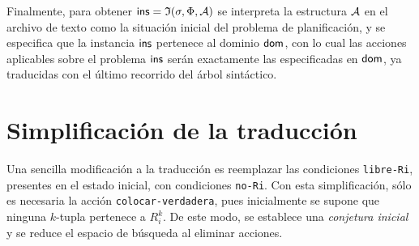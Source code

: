 Finalmente, para obtener $\mathsf{ins}=\mathfrak{I}(\sigma,\Phi,\mathcal{A})$ se interpreta la
estructura $\mathcal{A}$ en el archivo de texto como la situación inicial del problema
de planificación, y se especifica que la instancia $\mathsf{ins}$ pertenece al
dominio $\mathsf{dom}$, con lo cual las acciones aplicables sobre el problema
$\mathsf{ins}$ serán exactamente las especificadas en $\mathsf{dom}$, ya traducidas con
el último recorrido del árbol sintáctico.

\section{Simplificación de la traducción}
Una sencilla modificación a la traducción es reemplazar las
condiciones \texttt{libre-Ri}, presentes en el estado inicial, con
condiciones \texttt{no-Ri}. Con esta simplificación, sólo es necesaria la
acción \texttt{colocar-verdadera}, pues inicialmente se supone que ninguna
$k$-tupla pertenece a $R_i^k$. De este modo, se establece una \textit{conjetura
inicial} y se reduce el espacio de búsqueda al eliminar acciones.

%
%
%
